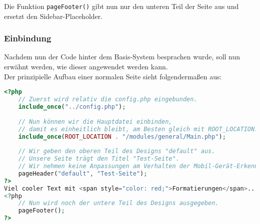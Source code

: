 
Die Funktion \texttt{pageFooter()} gibt nun nur den unteren Teil der Seite aus und ersetzt den Sidebar-Placeholder.

\subsubsection{Einbindung}
Nachdem nun der Code hinter dem Basis-System besprachen wurde, soll nun erwähnt werden, wie dieser angewendet werden kann.\\
Der prinzipielle Aufbau einer normalen Seite sieht folgendermaßen aus:
\begin{lstlisting}[style=custom, language=php, caption={Anwendung des Basis-Systems},label={lst:content_imple_base_apply}]
<?php 
	// Zuerst wird relativ die config.php eingebunden.
	include_once("../config.php");
	
	// Nun können wir die Hauptdatei einbinden, 
	// damit es einheitlich bleibt, am Besten gleich mit ROOT_LOCATION.
	include_once(ROOT_LOCATION . "/modules/general/Main.php");
	
	// Wir geben den oberen Teil des Designs "default" aus.
	// Unsere Seite trägt den Titel "Test-Seite".
	// Wir nehmen keine Anpassungen am Verhalten der Mobil-Gerät-Erkennung vor.
	pageHeader("default", "Test-Seite");
?>
Viel cooler Text mit <span style="color: red;">Formatierungen</span>...
<?php
	// Nun wird noch der untere Teil des Designs ausgegeben.
	pageFooter();
?>
\end{lstlisting}
